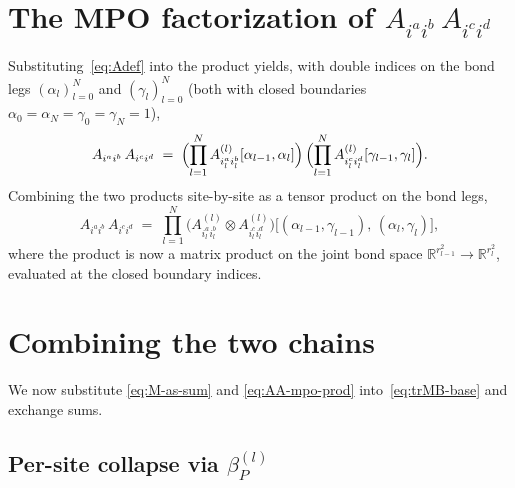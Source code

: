 \documentclass[11pt]{article}
\newcommand{\IR}{\mathbb{R}}
\begin{document}
\section{The MPO factorization of $A_{i^a i^b}\,A_{i^c i^d}$}\label{sec:mpo-double}

Substituting~\eqref{eq:Adef} into the product yields, with double indices
on the bond legs $(\alpha_l)_{l=0}^N$ and $(\gamma_l)_{l=0}^N$
(both with closed boundaries $\alpha_0=\alpha_N=\gamma_0=\gamma_N=1$),
\[
A_{i^a i^b}\,A_{i^c i^d}
\;=\;
\Bigl(\prod_{l=1}^N
A^{(l)}_{i^a_l i^b_l}[\alpha_{l-1},\alpha_l]\Bigr)\,
\Bigl(\prod_{l=1}^N
A^{(l)}_{i^c_l i^d_l}[\gamma_{l-1},\gamma_l]\Bigr).
\]
Combining the two products site-by-site as a tensor product on the bond legs,
\begin{equation}\label{eq:AA-mpo-prod}
A_{i^a i^b}\,A_{i^c i^d}
\;=\;
\prod_{l=1}^N
\bigl(A^{(l)}_{i^a_l i^b_l} \otimes A^{(l)}_{i^c_l i^d_l}\bigr)\!
\bigl[(\alpha_{l-1},\gamma_{l-1}),\,(\alpha_l,\gamma_l)\bigr],
\end{equation}
where the product is now a matrix product on the joint bond space
$\IR^{r_{l-1}^2}\to\IR^{r_l^2}$, evaluated at the closed boundary indices.

\section{Combining the two chains}\label{sec:assemble}

We now substitute \eqref{eq:M-as-sum} and \eqref{eq:AA-mpo-prod}
into~\eqref{eq:trMB-base} and exchange sums.

\subsection{Per-site collapse via $\beta_P^{(l)}$}
\end{document}
